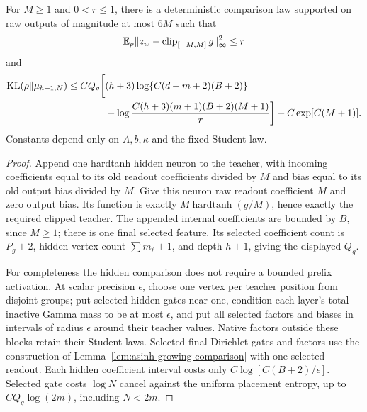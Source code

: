 \begin{lemma}
\label{lem:bounded-final-hidden-comparison}
For $M\ge1$ and $0<r\le1$, there is a deterministic comparison law
supported on raw outputs of magnitude at most $6M$ such that
\[
 \mathbb E_\rho\|z_w-\operatorname{clip}_{[-M,M]}g\|_\infty^2\le r
\]
and
\begin{align}
 \operatorname{KL}(\rho\|\mu_{h+1,N})\le C Q_g\bigg[&(h+3)
        \log\{C(d+m+2)(B+2)\}\notag\\
       &+\log\frac{C(h+3)(m+1)(B+2)(M+1)}{r}\bigg]
         +C\exp[C(M+1)].
 \label{eq:bounded-final-hidden-resource}
\end{align}
Constants depend only on $A,b,\kappa$ and the fixed Student law.
\end{lemma}
\begin{proof}
Append one hardtanh hidden neuron to the teacher, with incoming
coefficients equal to its old readout coefficients divided by $M$
and bias equal to its old output bias divided by $M$. Give this
neuron raw readout coefficient $M$ and zero output bias. Its function
is exactly $M\operatorname{hardtanh}(g/M)$, hence exactly the
required clipped teacher. The appended internal coefficients are
bounded by $B$, since $M\ge1$; there is one final selected feature.
Its selected coefficient count is $P_g+2$, hidden-vertex count
$\sum m_\ell+1$, and depth $h+1$, giving the displayed $Q_g$.

For completeness the hidden comparison does not require a bounded
prefix activation. At scalar precision $\epsilon$, choose one vertex
per teacher position from disjoint groups; put selected hidden gates
near one, condition each layer's total inactive Gamma mass to be at
most $\epsilon$, and put all selected factors and biases in intervals
of radius $\epsilon$ around their teacher values. Native factors
outside these blocks retain their Student laws. Selected final
Dirichlet gates and factors use the construction of
Lemma~\ref{lem:asinh-growing-comparison} with one selected readout.
Each hidden coefficient interval costs only
$C\log[C(B+2)/\epsilon]$. Selected gate costs $\log N$ cancel
against the uniform placement entropy, up to $C Q_g\log(2m)$,
including $N<2m$.


\end{proof}
